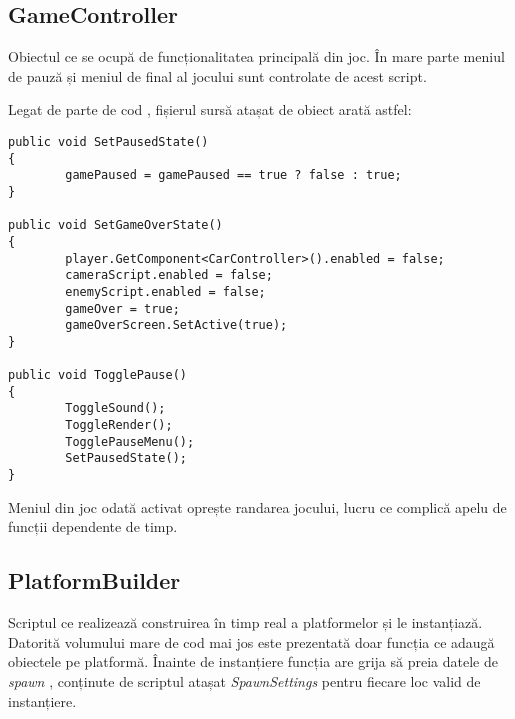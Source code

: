 \subsection{GameController}

Obiectul ce se ocupă de funcționalitatea principală din joc. În mare parte meniul de pauză și meniul de final al jocului sunt controlate de acest script.\par

Legat de parte de cod , fișierul sursă atașat de obiect arată astfel:\par

\begin{lstlisting}[caption=Funcțiile din GameController,
  label=a_label]
public void SetPausedState()
{
        gamePaused = gamePaused == true ? false : true;
}

public void SetGameOverState()
{
        player.GetComponent<CarController>().enabled = false;
        cameraScript.enabled = false;
        enemyScript.enabled = false;
        gameOver = true;
        gameOverScreen.SetActive(true);
}

public void TogglePause()
{
        ToggleSound();
        ToggleRender();
        TogglePauseMenu();
        SetPausedState();
}
\end{lstlisting}

Meniul din joc odată activat oprește randarea jocului, lucru ce complică apelu de funcții dependente de timp.\par

\subsection{PlatformBuilder}

Scriptul ce realizează construirea în timp real a platformelor și le instanțiază. Datorită volumului mare de cod mai jos este prezentată doar funcția ce adaugă obiectele pe platformă. Înainte de instanțiere funcția are grija să preia datele de \textit{spawn} , conținute de scriptul atașat \textit{SpawnSettings} pentru fiecare loc valid de instanțiere.\par

